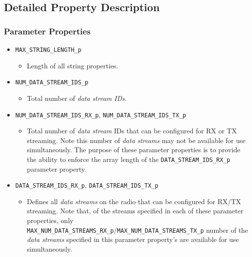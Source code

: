 \documentclass{article}
\begin{document}
\subsection{Detailed Property Description}
  \label{sec:detailed_property_description}

  \subsubsection{Parameter Properties}
  \begin{itemize}
    \item \verb+MAX_STRING_LENGTH_p+
      \begin{itemize}
        \item Length of all string properties.
      \end{itemize}
    \item \verb+NUM_DATA_STREAM_IDS_p+
      \begin{itemize}
        \item Total number of \textit{data stream IDs}.
      \end{itemize}
    \item \verb+NUM_DATA_STREAM_IDS_RX_p+, \verb+NUM_DATA_STREAM_IDS_TX_p+
      \begin{itemize}
        \item Total number of \textit{data stream} IDs that can be configured
          for RX or
          TX
          streaming. Note this number of
          \textit{data streams} may not be available for use simultaneously.
          The purpose
          of
          these parameter properties is to provide the ability
          to enforce the array length of the
          \verb+DATA_STREAM_IDS_RX_p+
          parameter property.
      \end{itemize}
    \item \verb+DATA_STREAM_IDS_RX_p+, \verb+DATA_STREAM_IDS_TX_p+
      \begin{itemize}
        \item Defines all \textit{data streams} on the radio that can be
          configured for
          RX/TX streaming.
          Note that, of the streams specified in each of these parameter
          properties, only \\
          \verb+MAX_NUM_DATA_STREAMS_RX_p+/\verb+MAX_NUM_DATA_STREAMS_TX_p+
          number of
          the \textit{data streams} specified in this parameter property's are
          available
          for use
          simultaneously.
      \end{itemize}

\end{itemize}
\end{document}
